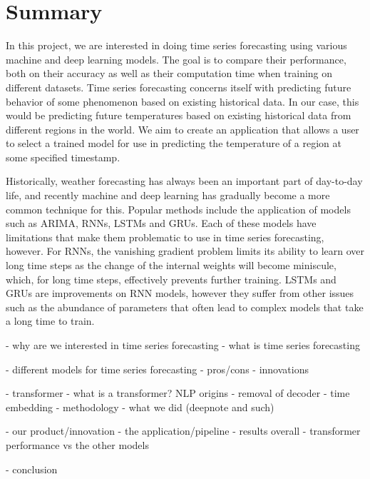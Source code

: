 \section*{Summary}
In this project, we are interested in doing time series forecasting using various machine and deep learning models.
The goal is to compare their performance, both on their accuracy as well as their computation time when training on different datasets.
Time series forecasting concerns itself with predicting future behavior of some phenomenon based on existing historical data.
In our case, this would be predicting future temperatures based on existing historical data from different regions in the world.
We aim to create an application that allows a user to select a trained model for use in predicting the temperature of a  region at some specified timestamp.

Historically, weather forecasting has always been an important part of day-to-day life, and recently machine and deep learning has gradually become a more common technique for this.
Popular methods include the application of models such as ARIMA, RNNs, LSTMs and GRUs.
Each of these models have limitations that make them problematic to use in time series forecasting, however.
For RNNs, the vanishing gradient problem limits its ability to learn over long time steps as the change of the internal weights will become miniscule, which, for long time steps, effectively prevents further training.
LSTMs and GRUs are improvements on RNN models, however they suffer from other issues such as the abundance of parameters that often lead to complex models that take a long time to train.



- why are we interested in time series forecasting
	- what is time series forecasting

- different models for time series forecasting
	- pros/cons
	- innovations

- transformer 
	- what is a transformer? NLP origins
	- removal of decoder
	- time embedding 
	- methodology - what we did (deepnote and such)

- our product/innovation - the application/pipeline 
	- results overall - transformer performance vs the other models

- conclusion 